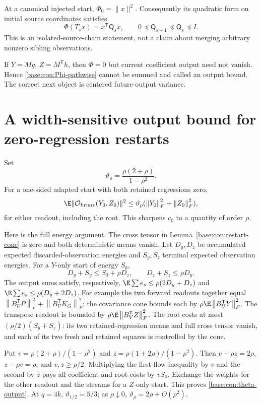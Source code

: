 \documentclass[11pt,oneside,openany,a4paper]{book}
\numberwithin{equation}{chapter}
\theoremstyle{definition}
\theoremstyle{remark}
\newcommand{\T}{\mathsf T}\newcommand{\Id}{I}
\newcommand{\F}[1]{\left\lVert#1\right\rVert_F}
\begin{document}
At a canonical injected start, $\Phi_0=\|x\|^2$. Consequently its quadratic form on initial source coordinates satisfies
\begin{equation}\label{base:con:Qmonotone}
 \Phi(T_sx)=x^\T\mathsf Q_sx,
 \qquad0\preceq\mathsf Q_{s+1}\preceq\mathsf Q_s\preceq I.
\end{equation}
This is an isolated-source-chain statement, not a claim about merging arbitrary nonzero sibling observations.

If $Y=Mg$, $Z=M^\T h$, then $\Phi=0$ but current coefficient output need not vanish. Hence \eqref{base:con:Phi-pathwise} cannot be summed and called an output bound. The correct next object is centered future-output variance.

\section{A width-sensitive output bound for zero-regression restarts}\label{base:con:theta}
Set
\begin{equation}\label{base:con:theta-def}
 \vartheta_\rho=\frac{\rho(2+\rho)}{1-\rho^2}.
\end{equation}
For a one-sided adapted start with both retained regressions zero,
\begin{equation}\label{base:con:theta-output}
 \E\|\mathcal O_{\rm future}(Y_0,Z_0)\|^2
 \le\vartheta_\rho(\F{Y_0}^2+\F{Z_0}^2),
\end{equation}
for either readout, including the root. This sharpens $c_0$ to a quantity of order $\rho$.

Here is the full energy argument. The cross tensor in Lemma~\ref{base:con:restart-cone} is zero and both deterministic means vanish. Let $D_y,D_z$ be accumulated expected discarded-observation energies and $S_y,S_z$ terminal expected observation energies. For a $Y$-only start of energy $S_0$,
\[
 D_y+S_y\le S_0+\rho D_z,\qquad
 D_z+S_z\le\rho D_y.
\]
The output sums satisfy, respectively,
$\E\sum e_s\le\rho(2D_y+D_z)$ and
$\E\sum e_s\le\rho(D_y+2D_z)$.
For example the two forward readouts together equal
$\F{B_U^\T P}^2+\F{B_U^\T K_G}^2$; the covariance cone bounds each by $\rho\E\F{B_U^\T Y}^2$. The transpose readout is bounded by $\rho\E\F{B_V^\T Z}^2$. The root costs at most $(\rho/2)(S_y+S_z)$: its two retained-regression means and full cross tensor vanish, and each of its two fresh and retained squares is controlled by the cone.

Put $v=\rho(2+\rho)/(1-\rho^2)$ and $z=\rho(1+2\rho)/(1-\rho^2)$. Then
$v-\rho z=2\rho$, $z-\rho v=\rho$, and $v,z\ge\rho/2$.
Multiplying the first flow inequality by $v$ and the second by $z$ pays all coefficient and root costs by $vS_0$. Exchange the weights for the other readout and the streams for a $Z$-only start. This proves \eqref{base:con:theta-output}. At $q=4k$, $\vartheta_{1/2}=5/3$; as $\rho\downarrow0$, $\vartheta_\rho=2\rho+O(\rho^2)$.
\end{document}
